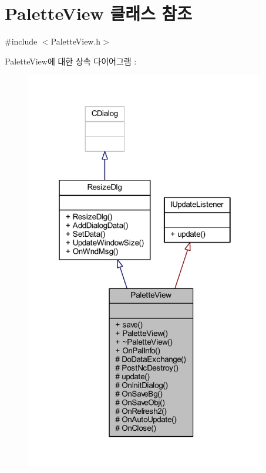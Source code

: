 \hypertarget{class_palette_view}{}\section{Palette\+View 클래스 참조}
\label{class_palette_view}


{\ttfamily \#include $<$Palette\+View.\+h$>$}



Palette\+View에 대한 상속 다이어그램 \+: \nopagebreak
\begin{figure}[H]
\begin{center}
\leavevmode
\includegraphics[width=298pt]{class_palette_view__inherit__graph}
\end{center}
\end{figure}



